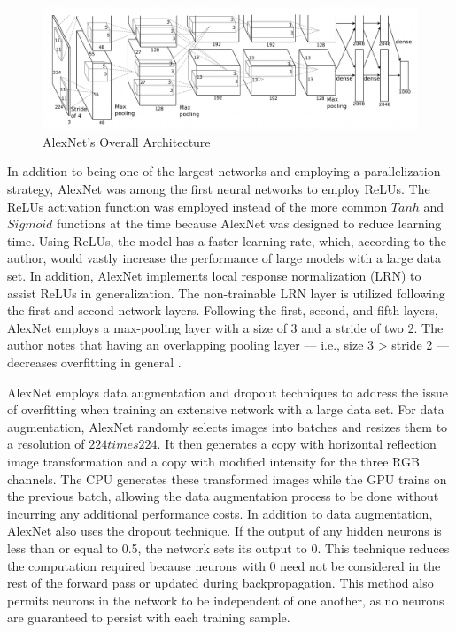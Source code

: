 \begin{figure}[!ht]
    \centering
    \includegraphics[width=6in]{figures/alex_net.png}
    \caption{AlexNet's Overall Architecture \cite{AlexNet_2017}} \label{fig:alex_net_architecture}
\end{figure}

In addition to being one of the largest networks and employing a parallelization strategy, AlexNet was among the first neural networks to employ ReLUs. The ReLUs activation function was employed instead of the more common $Tanh$ and $Sigmoid$ functions at the time because AlexNet was designed to reduce learning time. Using ReLUs, the model has a faster learning rate, which, according to the author, would vastly increase the performance of large models with a large data set. In addition, AlexNet implements local response normalization (LRN) to assist ReLUs in generalization. The non-trainable LRN layer is utilized following the first and second network layers. Following the first, second, and fifth layers, AlexNet employs a max-pooling layer with a size of 3 and a stride of two 2. The author notes that having an overlapping pooling layer — i.e., size 3 > stride 2 — decreases overfitting in general \cite{AlexNet_2017}.

AlexNet employs data augmentation and dropout techniques to address the issue of overfitting when training an extensive network with a large data set. For data augmentation, AlexNet randomly selects images into batches and resizes them to a resolution of $224 times 224$. It then generates a copy with horizontal reflection image transformation and a copy with modified intensity for the three RGB channels. The CPU generates these transformed images while the GPU trains on the previous batch, allowing the data augmentation process to be done without incurring any additional performance costs. In addition to data augmentation, AlexNet also uses the dropout technique. If the output of any hidden neurons is less than or equal to 0.5, the network sets its output to 0. This technique reduces the computation required because neurons with 0 need not be considered in the rest of the forward pass or updated during backpropagation. This method also permits neurons in the network to be independent of one another, as no neurons are guaranteed to persist with each training sample.

